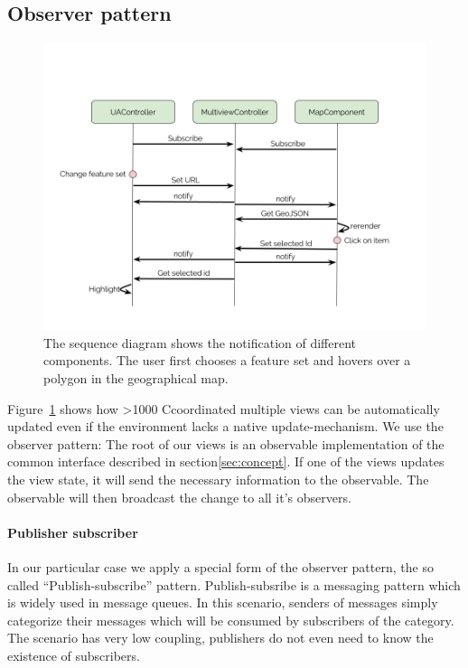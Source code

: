 \documentclass{article}
\newcommand\hmm[1]{\ifnum\ifhmode\spacefactor\else2000\fi>1000 \uppercase{#1}\else#1\fi}
\newcommand{\cmvs}{\hmm{c}oordinated multiple views}
\begin{document}
\subsection{Observer pattern}
\begin{figure}[h!]
  \centering
  \includegraphics[width=\textwidth]{images/sequence-diagram.png}
  \caption{%
    The sequence diagram shows the notification of different components.
  The user first chooses a feature set and hovers over a polygon in the geographical map.
  }\label{fig:implementation:sequence-diagram}
\end{figure}


Figure~\ref{fig:implementation:sequence-diagram} shows how \cmvs{} can be automatically updated even if the environment lacks a native update-mechanism.
We use the observer pattern:
The root of our views is an observable implementation of the common interface described in section\ref{sec:concept}.
If one of the views updates the view state, it will send the necessary information to the observable.
The observable will then broadcast the change to all it's observers.


\paragraph{Publisher subscriber}
In our particular case we apply a special form of the observer pattern, the so called ``Publish-subscribe'' pattern\cite{Eugster2003}.
Publish-subsribe is a messaging pattern which is widely used in message queues.
In this scenario, senders of messages simply categorize their messages which will be consumed by subscribers of the category.
The scenario has very low coupling, publishers do not even need to know the existence of subscribers.
\end{document}
